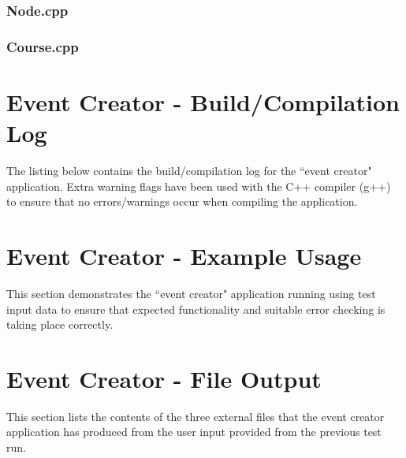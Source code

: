 \documentclass[a4paper, 12pt]{article}
\begin{document}
\clearpage
\subsubsection{Node.cpp}


\clearpage
\subsubsection{Course.cpp}


\clearpage
\section{Event Creator - Build/Compilation Log}

The listing below contains the build/compilation log for the ``event creator" application. Extra warning flags have been used with the C++ compiler (g++) to ensure that no errors/warnings occur when compiling the application.



\clearpage
\section{Event Creator - Example Usage}
This section demonstrates the ``event creator" application running using test input data to ensure that expected functionality and suitable error checking is taking place correctly.



\clearpage
\section{Event Creator - File Output}

This section lists the contents of the three external files that the event creator application has produced from the user input provided from the previous test run. 




\end{document}
